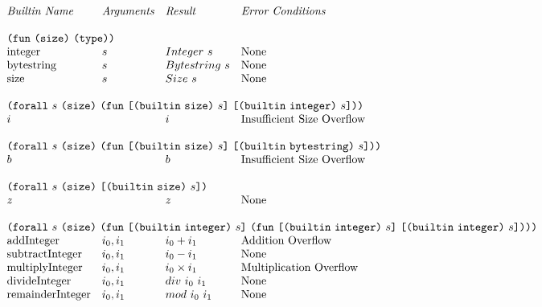 \documentclass[../main.tex]{subfiles}
\begin{document}
\begin{figure*}[t]
    \centering
    \footnotesize
    \[\begin{array}{llll}
        \textit{Builtin Name}               & \textit{Arguments} & \textit{Result} & \textit{Error Conditions}\\
        &&\\
        
        \multicolumn{4}{l}{\funK{\sizeK{}}{\typeK{}}}\\
        \mathrm{integer} & s & Integer ~ s & \textrm{None}\\
        \mathrm{bytestring} & s & Bytestring ~ s & \textrm{None}\\
        \mathrm{size} & s & Size ~ s & \textrm{None}\\
        &&\\
        
        \multicolumn{4}{l}{
          \forallT{s}{\sizeK{}}{
            \funT{\appT{\builtin{\builtinSizeType{}}}{s}}
                 {\appT{\builtinT{\builtinIntegerType{s}}}{s}}}}\\
        i & & i & \textrm{Insufficient Size Overflow}\\
        &&\\
        
        \multicolumn{4}{l}{
          \forallT{s}{\sizeK{}}{
            \funT{\appT{\builtin{\builtinSizeType{}}}{s}}
                 {\appT{\builtinT{\builtinBytestringType{}}}{s}}}}\\
        b & & b & \textrm{Insufficient Size Overflow}\\
        &&\\
        
        \multicolumn{4}{l}{
          \forallT{s}{\sizeK{}}{
            \appT{\builtinT{\builtinSizeType{}}}{s}}}\\
        z & & z & \textrm{None}\\
        &&\\
        
        \multicolumn{4}{l}{
          \forallT{s}{\sizeK{}}{
            \funT{\appT{\builtinT{\builtinIntegerType{}}}{s}}
                 {\funT{\appT{\builtinT{\builtinIntegerType{}}}{s}}
                       {\appT{\builtinT{\builtinIntegerType{}}}{s}}}}}\\
        \mathrm{addInteger}                 &  i_0 , i_1   &   i_0 + i_1         &   \textrm{Addition Overflow}   \\
        \mathrm{subtractInteger}            &  i_0 , i_1   &   i_0 - i_1         &   \textrm{None}       \\
        \mathrm{multiplyInteger}            &  i_0 , i_1   &   i_0 \times i_1    &   \textrm{Multiplication Overflow}   \\
        \mathrm{divideInteger}              &  i_0 , i_1   &   div ~ i_0 ~ i_1   &   \textrm{None}       \\
        \mathrm{remainderInteger}           &  i_0 , i_1   &   mod ~ i_0 ~ i_1   &   \textrm{None}       \\
        &&\\
        

\end{array}\]
\end{figure*}
\end{document}
